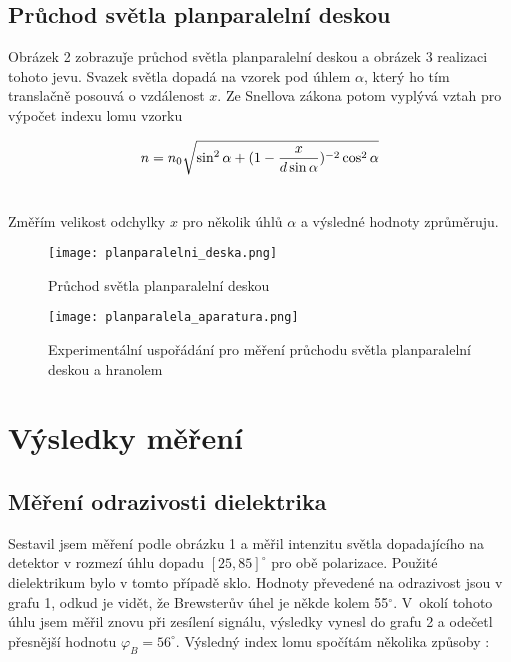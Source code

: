 \documentclass[a4paper,11pt]{article}
\begin{document}
\subsection{Průchod světla planparalelní deskou}

Obrázek 2 zobrazuǰe průchod světla planparalelní deskou a obrázek 3 realizaci tohoto jevu. Svazek světla dopadá na vzorek pod úhlem $ \alpha $, který ho tím translačně posouvá o vzdálenost $ x $. Ze Snellova zákona potom vyplývá vztah pro výpočet indexu lomu vzorku 


\begin{align}
n = n_0 \sqrt{\sin^2 \alpha + (1 - \frac{x}{d \sin \alpha})^{-2} \cos^2 \alpha } \\ \notag
\end{align}


Změřím velikost odchylky $ x $ pro několik úhlů $ \alpha $ a výsledné hodnoty zprůměruju.

\begin{figure}[htpb]
    \centering
    \texttt{[image: planparalelni\_deska.png]}
    \caption{Průchod světla planparalelní deskou}
\end{figure}

\begin{figure}[htpb]
    \centering
    \texttt{[image: planparalela\_aparatura.png]}
    \caption{Experimentální uspořádání pro měření průchodu světla planparalelní deskou a hranolem}
\end{figure}

\section{Výsledky měření}

\subsection{Měření odrazivosti dielektrika}

Sestavil jsem měření podle obrázku 1 a měřil intenzitu světla dopadajícího na detektor v rozmezí úhlu dopadu $ [25, 85]^{\circ} $ pro obě polarizace. Použité dielektrikum bylo v tomto případě sklo. Hodnoty převedené na odrazivost jsou v grafu 1, odkud je vidět, že Brewsterův úhel je někde kolem 55$ ^{\circ} $. V~okolí tohoto úhlu jsem měřil znovu při zesílení signálu, výsledky vynesl do grafu 2 a odečetl přesnější hodnotu $ \varphi_B = 56 ^{\circ} $. Výsledný index lomu spočítám několika způsoby :
\end{document}

